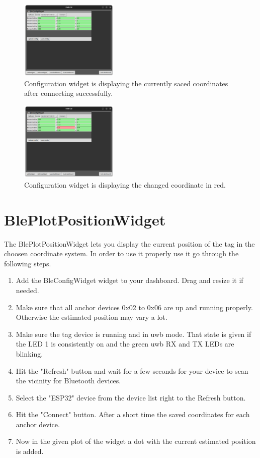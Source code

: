 \begin{figure}[!hbt]
	\centering
	\includegraphics[width=0.42\textwidth]{pictures/config_device_connected.png}
	\caption{Configuration widget is displaying the currently saced coordinates after connecting successfully.}
	\label{fig:config_device_connected}
\end{figure}

\begin{figure}[!hbt]
	\centering
	\includegraphics[width=0.42\textwidth]{pictures/config_coordinate_changed.png}
	\caption{Configuration widget is displaying the changed coordinate in red. }
	\label{fig:config_coordinate_changed}
\end{figure}

\newpage

\section{BlePlotPositionWidget}

The BlePlotPositionWidget lets you display the current position of the tag in the choosen coordinate system. 
In order to use it properly use it go through the following steps. 

\begin{enumerate}
	\item Add the BleConfigWidget widget to your dashboard. Drag and resize it if needed. 
	\item Make sure that all anchor devices 0x02 to 0x06 are up and running properly. Otherwise the estimated position may vary a lot. 
	\item Make sure the tag device is running and in uwb mode. That state is given if the LED 1 is consistently on and the green uwb RX and TX LEDs are blinking. 
	\item Hit the "Refresh" button and wait for a few seconds for your device to scan the vicinity for Bluetooth devices. 
	\item Select the "ESP32" device from the device list right to the Refresh button. 
	\item Hit the "Connect" button. After a short time the saved coordinates for each anchor device. 
	\item Now in the given plot of the widget a dot with the current estimated position is added. 
\end{enumerate}

